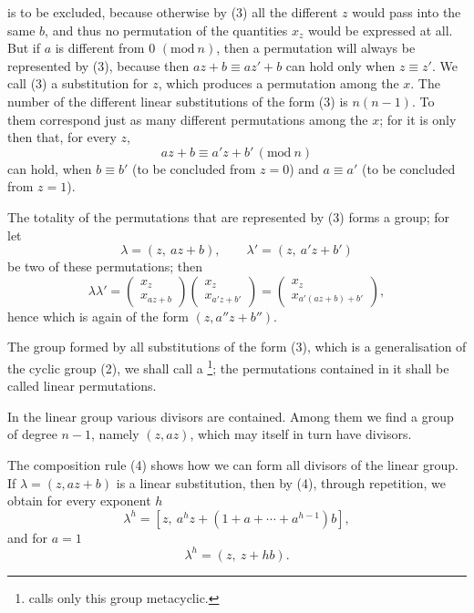is to be excluded, because otherwise by (3) all the different $z$
would pass into the same $b$, and thus no permutation of the quantities $x_z$ would be
expressed at all. But if $a$ is different from 0 $(\mathrm{mod}\ n)$, then a permutation
will always be represented by (3), because then $az+b \equiv az'+b$ can hold only when
$z \equiv z'$. We call (3) a substitution for $z$, which produces a permutation among
the $x$. The number of the different linear substitutions of the form (3)
is $n(n-1)$. To them correspond just as many different permutations among the $x$;
for it is only then that, for every $z$,
\[ az + b \equiv a'z + b' \, (\mathrm{mod}\ n) \]
can hold, when $b \equiv b'$ (to be concluded from $z = 0$) and $a \equiv a'$ (to be
concluded from $z = 1$).

The totality of the permutations that are represented by (3) forms a group;
for let
\[ \lambda = (z,\ az+b), \qquad \lambda' = (z,\ a'z+b') \]
be two of these permutations; then
\[
\lambda \lambda' =
\begin{pmatrix} x_z \\ x_{az+b} \end{pmatrix}
\begin{pmatrix} x_z \\ x_{a'z+b'} \end{pmatrix}
=
\begin{pmatrix} x_z \\ x_{a'(az+b)+b'} \end{pmatrix},
\]
hence
which is again of the form $(z, a''z+b'')$.

The group formed by all substitutions of the form (3), which is a
generalisation of the cyclic group (2), we shall call a
\footnote{ calls only this group
metacyclic.}; the permutations contained in it shall be called
linear permutations.

In the linear group various divisors are contained. Among them we find a
group of degree $n-1$, namely $(z, az)$, which may itself in turn have divisors.

The composition rule (4) shows how we can form all divisors of the linear
group. If $\lambda = (z, az+b)$ is a linear substitution, then by (4), through
repetition, we obtain for every exponent $h$
\[ \lambda^h = [z,\ a^h z + (1 + a + \cdots + a^{h-1})b], \]
and for $a = 1$
\[ \lambda^h = (z,\ z + hb). \]
